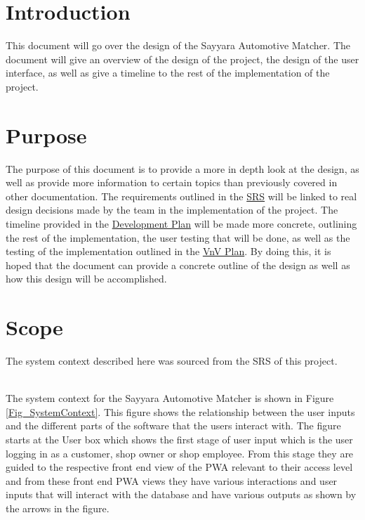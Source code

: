 \documentclass[12pt, titlepage]{article}
\begin{document}

\section{Introduction}

This document will go over the design of the Sayyara Automotive Matcher. The document will give an overview of the design of the project, the design of the user interface, as well as give a timeline to the rest of the implementation of the project.

\section{Purpose}

The purpose of this document is to provide a more in depth look at the design, as well as provide more information to certain topics than previously covered in other documentation. The requirements outlined in the \href{https://github.com/HKanwal/kapstone/blob/main/docs/SRS/SRS.pdf}{SRS}
 will be linked to real design decisions made by the team in the implementation of the project. The timeline provided in the \href{https://github.com/HKanwal/kapstone/blob/main/docs/DevelopmentPlan/DevelopmentPlan.pdf}{Development Plan} will be made more concrete, outlining the rest of the implementation, the user testing that will be done, as well as the testing of the implementation outlined in the \href{https://github.com/HKanwal/kapstone/blob/main/docs/VnVPlan/VnVPlan.pdf}{VnV Plan}. By doing this, it is hoped that the document can provide a concrete outline of the design as well as how this design will be accomplished.

\section{Scope}
The system context described here was sourced from the SRS of this project.

\noindent 
\\The system context for the Sayyara Automotive Matcher is shown in Figure \ref{Fig_SystemContext}. This figure shows the relationship between the user inputs and the different parts of the software that the users interact with. The figure starts at the User box which shows the first stage of user input which is the user logging in as a customer, shop owner or shop employee. From this stage they are guided to the respective front end view of the PWA relevant to their access level and from these front end PWA views they have various interactions and user inputs that will interact with the database and have various outputs as shown by the arrows in the figure.
\end{document}
